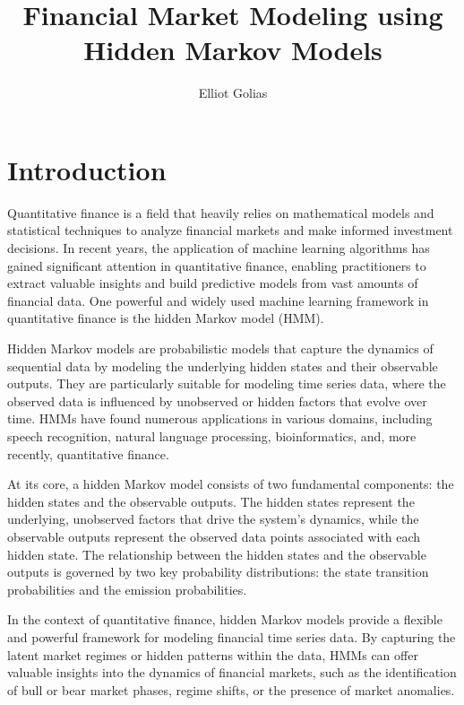 \documentclass[a4paper,11pt]{article}
\title{Financial Market Modeling using Hidden Markov Models}
\author{Elliot Golias}
\begin{document}
 
\maketitle
\flushbottom

\section{Introduction}
\label{sec:intro}

Quantitative finance is a field that heavily relies on mathematical models and statistical techniques to
analyze financial markets and make informed investment decisions. In recent years, the application of
machine learning algorithms has gained significant attention in quantitative finance, enabling
practitioners to extract valuable insights and build predictive models from vast amounts of financial
data. One powerful and widely used machine learning framework in quantitative finance is the hidden
Markov model (HMM).

Hidden Markov models are probabilistic models that capture the dynamics of sequential
data by modeling the underlying hidden states and their observable outputs. They are particularly suitable for modeling time series data, where the observed data is influenced by unobserved or hidden factors that evolve over time. HMMs have found numerous applications in various domains, including speech recognition, natural language processing, bioinformatics, and, more recently, quantitative finance.

At its core, a hidden Markov model consists of two fundamental components: the hidden states and the observable outputs. The hidden states represent the underlying, unobserved factors that drive the system's dynamics, while the observable outputs represent the observed data points associated with each hidden state. The relationship between the hidden states and the observable outputs is governed by two key probability distributions: the state transition probabilities and the emission probabilities.

In the context of quantitative finance, hidden Markov models provide a flexible and powerful framework for modeling financial time series data. By capturing the latent market regimes or hidden patterns within the data, HMMs can offer valuable insights into the dynamics of financial markets, such as the identification of bull or bear market phases, regime shifts, or the presence of market anomalies.
\end{document}
